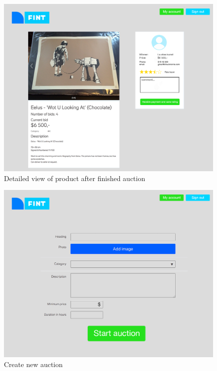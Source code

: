 \begin{figure}
	\caption{Detailed view of product after finished auction}
	\centering
		\includegraphics[scale=0.38]{figures/detailed-view-finished-aucution}
\end{figure}

\begin{figure}
	\caption{Create new auction}
	\centering
		\includegraphics[scale=0.38]{figures/Create-new-auction}
\end{figure}




